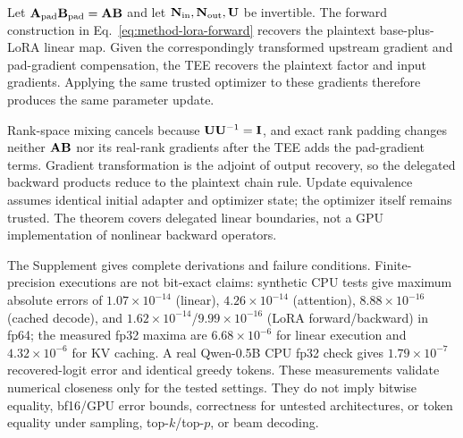 \begin{theorem}\label{thm:lora-equivalence}
Let $\mathbf{A}_{\mathrm{pad}}\mathbf{B}_{\mathrm{pad}}=\mathbf{A}\mathbf{B}$ and let $\mathbf{N}_{\mathrm{in}},\mathbf{N}_{\mathrm{out}},\mathbf{U}$ be invertible.  The
forward construction in Eq.~\eqref{eq:method-lora-forward} recovers the
plaintext base-plus-LoRA linear map. Given the correspondingly transformed
upstream gradient and pad-gradient compensation, the TEE recovers the plaintext
factor and input gradients. Applying the same trusted
optimizer to these gradients therefore produces the same parameter update.
\end{theorem}

Rank-space mixing cancels because $\mathbf{U}\mathbf{U}^{-1}=\mathbf I$, and exact rank
padding changes neither $\mathbf{A}\mathbf{B}$ nor its real-rank gradients after the TEE
adds the pad-gradient terms.  Gradient transformation is the adjoint of output
recovery, so the delegated backward products reduce to the plaintext chain
rule.  Update equivalence assumes identical initial adapter and optimizer state;
the optimizer itself remains trusted.  The theorem covers delegated linear
boundaries, not a GPU implementation of nonlinear backward operators.

The Supplement gives complete derivations and failure conditions.
Finite-precision executions are not bit-exact claims: synthetic CPU tests give
maximum absolute errors of $1.07\times10^{-14}$ (linear),
$4.26\times10^{-14}$ (attention), $8.88\times10^{-16}$ (cached decode), and
$1.62\times10^{-14}$/$9.99\times10^{-16}$ (LoRA forward/backward) in fp64;
the measured fp32 maxima are $6.68\times10^{-6}$ for linear execution and
$4.32\times10^{-6}$ for KV caching.  A real Qwen-0.5B CPU fp32 check gives
$1.79\times10^{-7}$ recovered-logit error and identical greedy tokens.  These
measurements validate numerical closeness only for the tested settings.  They
do not imply bitwise equality, bf16/GPU error bounds, correctness for untested
architectures, or token equality under sampling, top-$k$/top-$p$, or beam
decoding.
